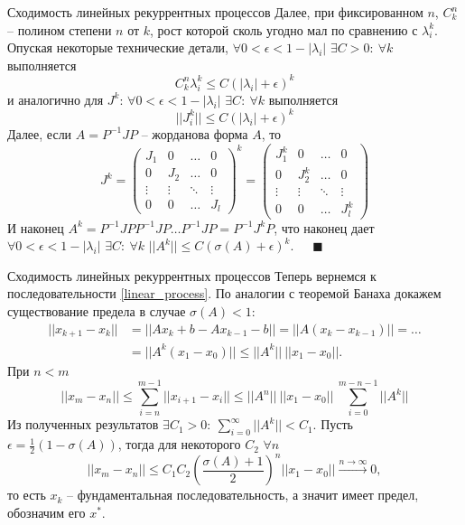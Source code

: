 \documentclass[10pt, handout]{beamer}
\begin{document}
\begin{frame}{Сходимость линейных рекуррентных процессов}
Далее, при фиксированном $n$, $C_k^n$ -- полином степени $n$ от $k$, рост которой сколь угодно мал по сравнению с $\lambda^k_i$. Опуская некоторые технические детали, $\forall 0<\epsilon<1-|\lambda_i|$ $\exists C>0:~\forall k$ выполняется
$$
C_k^n\lambda_i^k\leq C(|\lambda_i|+\epsilon)^k
$$
и аналогично для $J^k$: $\forall 0<\epsilon<1-|\lambda_i|$ $\exists C:~\forall k$ выполняется
$$
||J_i^k||\leq C(|\lambda_i|+\epsilon)^k 
$$
\pause
Далее, если $A=P^{-1}JP$ -- жорданова форма $A$, то
$$
J^k=\left(
\begin{array}{cccc}
J_1 & 0 & \ldots & 0\\
0 & J_2 & \ldots & 0\\
\vdots & \vdots & \ddots & \vdots \\
0 & 0 & \ldots & J_l
\end{array}
\right)^k
=
\left(
\begin{array}{cccc}
J_1^k & 0 & \ldots & 0\\
0 & J_2^k & \ldots & 0\\
\vdots & \vdots & \ddots & \vdots \\
0 & 0 & \ldots & J_l^k
\end{array}
\right)
$$
\pause
И наконец $A^k=P^{-1}JPP^{-1}JP\ldots P^{-1}JP=P^{-1}J^kP$, что наконец дает $\forall 0<\epsilon<1-|\lambda_i|$ $\exists C:~\forall k$ $||A^k||\leq C(\sigma(A)+\epsilon)^k$.~~~$\blacksquare$
\end{frame}

\begin{frame}{Сходимость линейных рекуррентных процессов}
Теперь вернемся к последовательности \eqref{linear_process}. По аналогии с теоремой Банаха докажем существование предела в случае $\sigma(A)<1$:
\begin{align*}
||x_{k+1}-x_k||&=||Ax_k+b-Ax_{k-1}-b||=||A(x_k-x_{k-1})||=\ldots\\
&=||A^k(x_1-x_0)||\leq ||A^k||~||x_1-x_0||.
\end{align*}
\pause
При $n<m$
$$
||x_m-x_n||\leq \sum_{i=n}^{m-1}||x_{i+1}-x_i||\leq ||A^n||~||x_1-x_0||~\sum_{i=0}^{m-n-1}||A^k||
$$
\pause
Из полученных результатов $\exists C_1>0:~\sum_{i=0}^{\infty}||A^k||<C_1$. Пусть $\epsilon=\frac{1}{2}(1-\sigma(A))$, тогда для некоторого $C_2$ $\forall n$ 
$$
||x_m-x_n||\leq C_1C_2\left(\frac{\sigma(A)+1}{2}\right)^n  ||x_1-x_0||\xrightarrow{n\rightarrow \infty} 0,
$$
то есть $x_k$ -- фундаментальная последовательность, а значит имеет предел, обозначим его $x^*$.
\end{frame}
\end{document}

